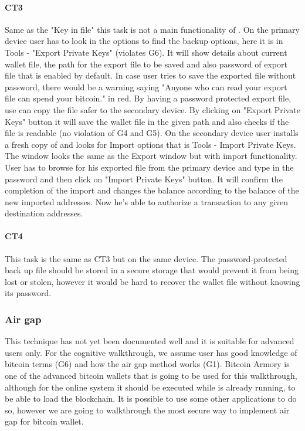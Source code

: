 \paragraph{CT3} Same as the "Key in file" this task is not a main functionality of \multibit. On the primary device user has to look in the options to find the backup options, here it is in Tools - "Export Private Keys" (violates G6). It will show details about current wallet file, the path for the export file to be saved and also password of export file that is enabled by default. In case user tries to save the exported file without password, there would be a warning saying "Anyone who can read your export file can spend your bitcoin." in red. By having a password protected export file, use can copy the file safer to the secondary device. By clicking on "Export Private Keys" button it will save the wallet file in the given path and also checks if the file is readable (no violation of G4 and G5). On the secondary device user installs a fresh copy of \multibit and looks for Import options that is Tools - Import Private Keys. The window looks the same as the Export window but with import functionality. User has to browse for his exported file from the primary device and type in the password and then click on "Import Private Keys" button. It will confirm the completion of the import and changes the balance according to the balance of the new imported addresses. Now he's able to authorize a transaction to any given destination addresses.


\paragraph{CT4} This task is the same as CT3 but on the same device. The password-protected back up file should be stored in a secure storage that would prevent it from being lost or stolen, however it would be hard to recover the wallet file without knowing its password. 



\subsubsection{Air gap}
\label{air gap}
This technique has not yet been documented well and it is suitable for advanced users only. For the cognitive walkthrough, we assume user has good knowledge of bitcoin terms (G6) and how the air gap method works (G1). Bitcoin Armory is one of the advanced bitcoin wallets that is going to be used for this walkthrough, although for the online system it should be executed while \bitcoinclient is already running, to be able to load the blockchain. It is possible to use some other applications to do so, however we are going to walkthrough the most secure way to implement air gap for bitcoin wallet.

